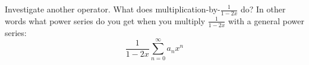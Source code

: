 Investigate another operator. What does multiplication-by-$\frac{1}{1-2x}$
do?
In other words what power series do you get when you multiply 
$\frac{1}{1-2x}$ with a general power series:
\[
\frac{1}{1 - 2x} \sum_{n=0}^\infty a_n x^n
\]
